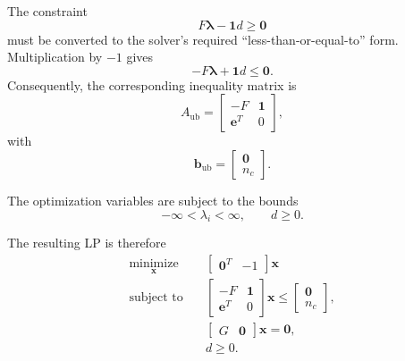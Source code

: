 The constraint
\begin{equation}
    F\boldsymbol{\lambda}
    -\boldsymbol{1}d
    \geq \boldsymbol{0}
\end{equation}
must be converted to the solver's required ``less-than-or-equal-to''
form. Multiplication by $-1$ gives
\begin{equation}
    -F\boldsymbol{\lambda}
    +\boldsymbol{1}d
    \leq \boldsymbol{0}.
\end{equation}
Consequently, the corresponding inequality matrix is
\begin{equation}
    A_{\mathrm{ub}}
    =
    \begin{bmatrix}
        -F & \boldsymbol{1}\\
        \boldsymbol{e}^{T} & 0
    \end{bmatrix},
\end{equation}
with
\begin{equation}
    \boldsymbol{b}_{\mathrm{ub}}
    =
    \begin{bmatrix}
        \boldsymbol{0}\\
        n_c
    \end{bmatrix}.
\end{equation}

The optimization variables are subject to the bounds
\begin{equation}
    -\infty < \lambda_i < \infty,
    \qquad
    d\geq0.
\end{equation}

The resulting LP is therefore
\begin{equation}
\boxed{
\begin{aligned}
    \underset{\boldsymbol{x}}{\operatorname{minimize}}
    \quad&
    \begin{bmatrix}
        \boldsymbol{0}^{T} & -1
    \end{bmatrix}
    \boldsymbol{x}\\
    \text{subject to}
    \quad&
    \begin{bmatrix}
        -F & \boldsymbol{1}\\
        \boldsymbol{e}^{T} & 0
    \end{bmatrix}
    \boldsymbol{x}
    \leq
    \begin{bmatrix}
        \boldsymbol{0}\\
        n_c
    \end{bmatrix},\\
    &
    \begin{bmatrix}
        G & \boldsymbol{0}
    \end{bmatrix}
    \boldsymbol{x}
    =
    \boldsymbol{0},\\
    &d\geq0.
\end{aligned}
}
\end{equation}

